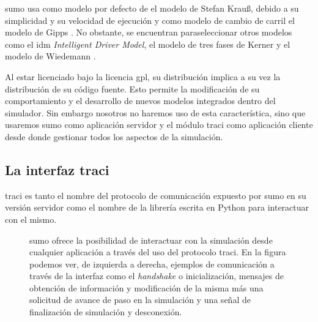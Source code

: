 \gls{sumo} usa como modelo por defecto de \textit{} el modelo de Stefan Krauß\cite{jin2016evaluation}, debido a su simplicidad y su velocidad de ejecución y como modelo de cambio de carril el modelo de Gipps \cite{krajzewicz2002sumo}. No obstante, se encuentran paraseleccionar otros modelos como el \gls{idm} \textit{Intelligent Driver Model}, el modelo de tres fases de Kerner \cite{kerner2008testbed} y el modelo de Wiedemann \cite{wiedemann1974simulation}.

Al estar licenciado bajo la licencia \gls{gpl}, su distribución implica a su vez la distribución de su código fuente. Esto permite la modificación de su comportamiento y el desarrollo de nuevos modelos integrados dentro del simulador. Sin embargo nosotros no haremos uso de esta característica, sino que usaremos \gls{sumo} como aplicación servidor y el módulo \gls{traci} como aplicación cliente desde donde gestionar todos los aspectos de la simulación.

\subsection{La interfaz \gls{traci}}

\gls{traci} \cite{Wegener2008} es tanto el nombre del protocolo de comunicación expuesto por \gls{sumo} en su versión servidor como el nombre de la librería escrita en Python para interactuar con el mismo.

\begin{figure}
	\centering
	\caption[Ejemplo de forma de envío de mensajes a través de TraCI]{\gls{sumo} ofrece la posibilidad de interactuar con la simulación desde cualquier aplicación a través del uso del protocolo \gls{traci}. En la figura podemos ver, de izquierda a derecha, ejemplos de comunicación a través de la interfaz como el \textit{handshake} o inicialización, mensajes de obtención de información y modificación de la misma más una solicitud de avance de paso en la simulación y una señal de finalización de simulación y desconexión.}
	\label{fig:traci-messages}
\end{figure}

